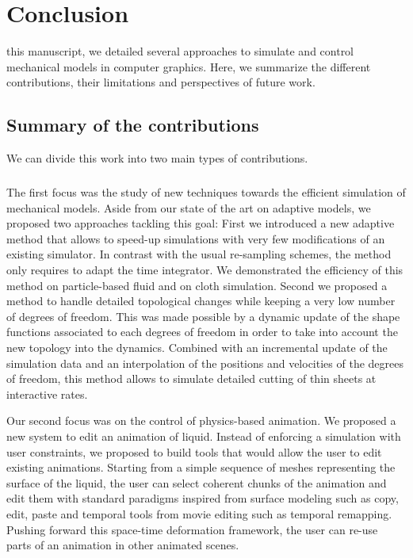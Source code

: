 \chapter[Conclusion]{Conclusion}
\label{chap:conclusion}

 this manuscript, we detailed several approaches to simulate and control mechanical models in computer graphics. 
Here, we summarize the different contributions, their limitations and perspectives of future work.

\section{Summary of the contributions}
We can divide this work into two main types of contributions.
\paragraph*{}
The first focus was the study of new techniques towards the efficient simulation of mechanical models. 
Aside from our state of the art on adaptive models, we proposed two approaches tackling this goal: 
First we introduced a new adaptive method that allows to speed-up simulations with very few modifications of an existing simulator. 
In contrast with the usual re-sampling schemes, the method only requires to adapt the time integrator. 
We demonstrated the efficiency of this method on particle-based fluid and on cloth simulation.
Second we proposed a method to handle detailed topological changes while keeping a very low number of degrees of freedom. 
This was made possible by a dynamic update of the shape functions associated to each degrees of freedom in order to take into account the new topology into the dynamics. 
Combined with an incremental update of the simulation data and an interpolation of the positions and velocities of the degrees of freedom, this method allows to simulate detailed cutting of thin sheets at interactive rates.

Our second focus was on the control of physics-based animation. We proposed a new system to edit an animation of liquid. 
Instead of enforcing a simulation with user constraints, we proposed to build tools that would allow the user to edit existing animations.
Starting from a simple sequence of meshes representing the surface of the liquid, the user can select coherent chunks of the animation and edit them with standard paradigms inspired from surface modeling such as copy, edit, paste and temporal tools from movie editing such as temporal remapping. 
Pushing forward this space-time deformation framework, the user can re-use parts of an animation in other animated scenes.

